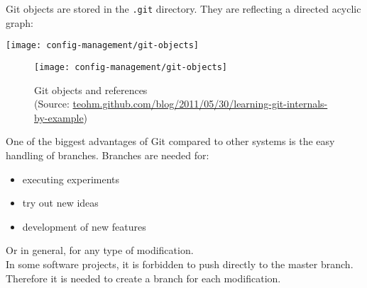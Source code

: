 \newslide
Git objects are stored in the \verb|.git| directory. They are reflecting a
directed acyclic graph:
\ifslides
\begin{center}
  \texttt{[image: config-management/git-objects]}
\end{center}
\else
\begin{figure}[H]
  \centering
  \texttt{[image: config-management/git-objects]}
  \caption[Git-Objekte und Referenzen]{Git objects and references \\
(Source: \href{http://teohm.github.com/blog/2011/05/30/learning-git-internals-by-example}
                {teohm.github.com/blog/2011/05/30/learning-git-internals-by-example})}
  \label{fig:gitobjects}
\end{figure}
\fi
\newslide
One of the biggest advantages of Git compared to other systems is the easy
handling of branches. Branches are needed for:
\begin{itemize}
\item executing experiments
\item try out new ideas
\item development of new features
\end{itemize}
Or in general, for any type of modification.\\
In some software projects, it is forbidden to push directly to the master
branch. Therefore it is needed to create a branch for each modification.
%
\newslide
